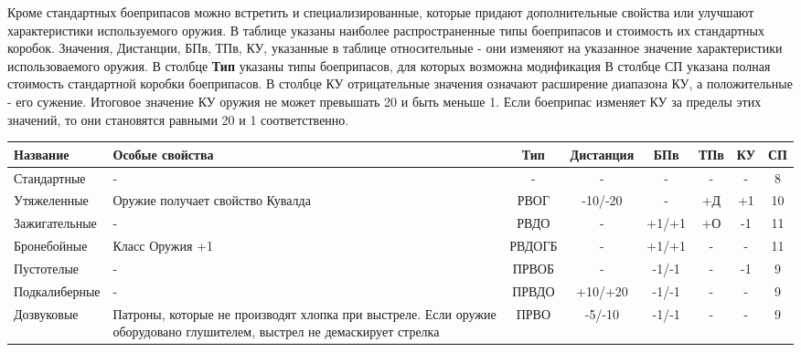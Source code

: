 Кроме стандартных боеприпасов можно встретить и специализированные, которые придают дополнительные свойства или улучшают характеристики используемого оружия. В таблице указаны наиболее распространенные типы боеприпасов и стоимость их стандартных коробок.
\newline Значения, Дистанции, БПв, ТПв, КУ, указанные в таблице относительные - они изменяют на указанное значение характеристики использоваемого оружия.
\newline В столбце \textbf{Тип} указаны типы боеприпасов, для которых возможна модификация
\newline В столбце СП указана полная стоимость стандартной коробки боеприпасов.
\newline В столбце КУ отрицательные значения означают расширение диапазона КУ, а положительные - его сужение. Итоговое значение КУ оружия не может превышать 20 и быть меньше 1. Если боеприпас изменяет КУ за пределы этих значений, то они становятся равными 20 и 1 соответственно.

\begin{longtable}{|p{3cm}|p{2.5cm}|c||c|c|c|c||c|}\hline
Название & Особые свойства & Тип & Дистанция & БПв & ТПв & КУ & СП\\ \hline
Стандартные & - & - & - & - & - & - & 8\\ \hline
Утяжеленные & Оружие получает свойство Кувалда & РВОГ & -10/-20 & - & +Д & +1 & 10\\ \hline
Зажигательные & - & РВДО & - & +1/+1 & +О & -1 & 11\\ \hline
Бронебойные & Класс Оружия +1 & РВДОГБ & - & +1/+1 & - & - & 11\\ \hline
Пустотелые & - & ПРВОБ & - & -1/-1 & - & -1 & 9\\ \hline
Подкалиберные & - & ПРВДО & +10/+20 & -1/-1 & - & - & 9\\ \hline
Дозвуковые & Патроны, которые не производят хлопка при выстреле. Если оружие оборудовано глушителем, выстрел не демаскирует стрелка & ПРВО & -5/-10 & -1/-1 & - & - & 9\\ \hline
\end{longtable}